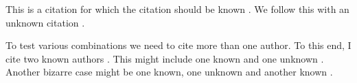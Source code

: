 \documentclass{article}
\begin{document}
This is a citation for which the citation should be known \cite{known}.
We follow this with an unknown citation \cite{unknown}.

To test various combinations we need to cite more than one author.  To this
end, I cite two known authors \cite{known,known2}.  This might include one
known and one unknown \cite{unknown,known}.  Another bizarre case might be
one known, one unknown and another known \cite{known,unknown,known2}.



\end{document}
